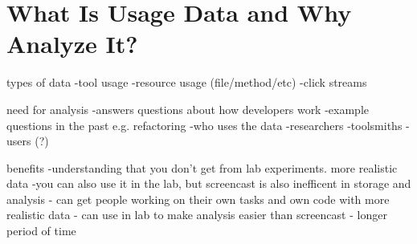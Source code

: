 \section{What Is Usage Data and Why Analyze It?}

types of data
	-tool usage
	-resource usage (file/method/etc)
	-click streams

need for analysis
	-answers questions about how developers work
	-example questions in the past e.g. refactoring
	-who uses the data
		-researchers
		-toolsmiths
		-users (?)

benefits
	-understanding that you don't get from lab experiments. more realistic data
	-you can also use it in the lab, but screencast is also inefficent in storage and analysis
		- can get people working on their own tasks and own code with more realistic data
		- can use in lab to make analysis easier than screencast
		- longer period of time
